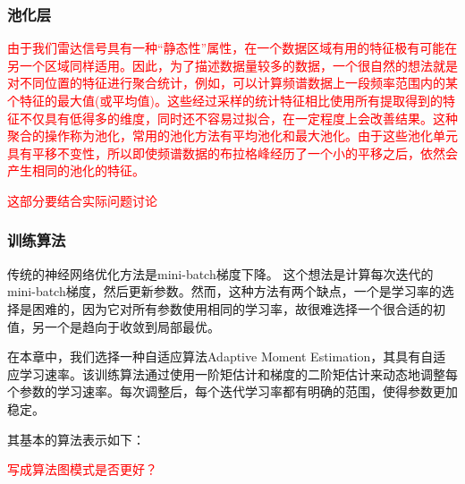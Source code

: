 \subsubsection{池化层}
\textcolor{red}{由于我们雷达信号具有一种“静态性”属性，在一个数据区域有用的特征极有可能在另一个区域同样适用。因此，为了描述数据量较多的数据，一个很自然的想法就是对不同位置的特征进行聚合统计，例如，可以计算频谱数据上一段频率范围内的某个特征的最大值(或平均值)。这些经过采样的统计特征相比使用所有提取得到的特征不仅具有低得多的维度，同时还不容易过拟合，在一定程度上会改善结果。这种聚合的操作称为池化，常用的池化方法有平均池化和最大池化。由于这些池化单元具有平移不变性，所以即使频谱数据的布拉格峰经历了一个小的平移之后，依然会产生相同的池化的特征。
}

\textcolor{red}{这部分要结合实际问题讨论}

\subsubsection{训练算法}
传统的神经网络优化方法是mini-batch梯度下降。 这个想法是计算每次迭代的mini-batch梯度，然后更新参数。然而，这种方法有两个缺点，一个是学习率的选择是困难的，因为它对所有参数使用相同的学习率，故很难选择一个很合适的初值，另一个是趋向于收敛到局部最优。

在本章中，我们选择一种自适应算法Adaptive Moment Estimation，其具有自适应学习速率。该训练算法通过使用一阶矩估计和梯度的二阶矩估计来动态地调整每个参数的学习速率。每次调整后，每个迭代学习率都有明确的范围，使得参数更加稳定。

其基本的算法表示如下：

\textcolor{red}{写成算法图模式是否更好？}

